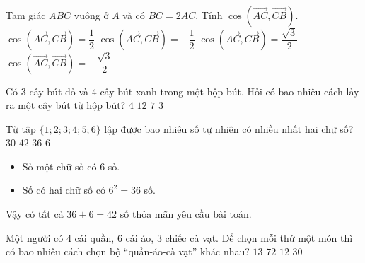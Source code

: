\begin{ex}%
	Tam giác $ABC$ vuông ở $A$ và có $BC=2AC$. Tính $\cos\left(\overrightarrow{AC},\overrightarrow{CB}\right)$.
	\choice
	{$\cos\left(\overrightarrow{AC},\overrightarrow{CB}\right)=\dfrac{1}{2}$}
	{\True $\cos\left(\overrightarrow{AC},\overrightarrow{CB}\right)=-\dfrac{1}{2}$}
	{$\cos\left(\overrightarrow{AC},\overrightarrow{CB}\right)=\dfrac{\sqrt{3}}{2}$}
	{$\cos\left(\overrightarrow{AC},\overrightarrow{CB}\right)=-\dfrac{\sqrt{3}}{2}$}
\end{ex}

\begin{ex} %
	Có $3$ cây bút đỏ và $4$ cây bút xanh trong một hộp bút. Hỏi có bao nhiêu cách lấy ra một cây bút từ hộp bút?
	\choice
	{$4$}
	{$12$}
	{\True $7$}
	{$3$}
\end{ex}

\begin{ex}%
	Từ tập $\{1;2;3;4;5;6\}$ lập được bao nhiêu số tự nhiên có nhiều nhất hai chữ số?
	\choice
	{$30$}
	{\True $42$}
	{$36$}
	{$6$}
	\loigiai
	{
		\begin{itemize}
			\item Số một chữ số có $6$ số.
			\item Số có hai chữ số có $6^2=36$ số.
		\end{itemize}
		Vậy có tất cả $36+6=42$ số thỏa mãn yêu cầu bài toán.
	}
\end{ex}

\begin{ex}%
	Một người có $4$ cái quần, $6$ cái áo, $3$ chiếc cà vạt. Để chọn mỗi thứ một món thì có bao nhiêu cách chọn bộ ``quần-áo-cà vạt'' khác nhau?
	\choice
	{$13$}
	{\True $72$}
	{$12$}
	{$30$}
\end{ex}


